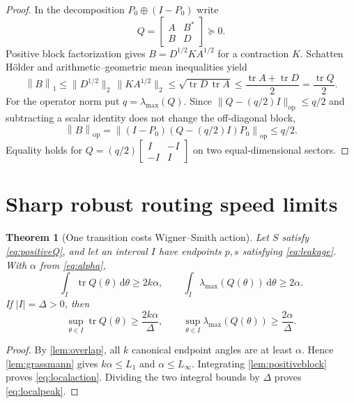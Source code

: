 \documentclass[11pt]{article}
\newtheorem{theorem}{Theorem}[section]
\theoremstyle{definition}
\theoremstyle{remark}
\newcommand{\tr}{\operatorname{tr}}
\newcommand{\dd}{\mathrm{d}}
\newcommand{\snorm}[1]{\left\lVert#1\right\rVert_1}
\newcommand{\onorm}[1]{\left\lVert#1\right\rVert_{\mathrm{op}}}
\begin{document}
\begin{proof}
In the decomposition $P_0\oplus(I-P_0)$ write
\[
 Q=\begin{bmatrix}A&B^*\\B&D\end{bmatrix}\succeq0.
\]
Positive block factorization gives
$B=D^{1/2}KA^{1/2}$ for a contraction $K$.  Schatten H\"older and
arithmetic--geometric mean inequalities yield
\[
 \snorm{B}
 \leq\|D^{1/2}\|_2\,\|KA^{1/2}\|_2
 \leq\sqrt{\tr D\,\tr A}
 \leq\frac{\tr A+\tr D}{2}=\frac{\tr Q}{2}.
\]
For the operator norm put $q=\lambda_{\max}(Q)$.  Since
$\|Q-(q/2)I\|_{\mathrm{op}}\leq q/2$ and subtracting a scalar identity does
not change the off-diagonal block,
\[
 \onorm{B}
 =\onorm{(I-P_0)(Q-(q/2)I)P_0}\leq q/2.
\]
Equality holds for
$Q=(q/2)\left[\begin{smallmatrix}I&-I\\-I&I\end{smallmatrix}\right]$
on two equal-dimensional sectors.
\end{proof}

\section{Sharp robust routing speed limits}

\begin{theorem}[One transition costs Wigner--Smith action]
\label{thm:local}
Let $S$ satisfy \eqref{eq:positiveQ}, and let an interval $I$ have endpoints
$p,s$ satisfying \eqref{eq:leakage}.  With $\alpha$ from
\eqref{eq:alpha},
\begin{equation}\label{eq:localaction}
 \boxed{
 \int_I\tr Q(\theta)\,\dd\theta\geq2k\alpha,
 \qquad
 \int_I\lambda_{\max}(Q(\theta))\,\dd\theta\geq2\alpha.}
\end{equation}
If $|I|=\Delta>0$, then
\begin{equation}\label{eq:localpeak}
 \boxed{
 \sup_{\theta\in I}\tr Q(\theta)\geq\frac{2k\alpha}{\Delta},
 \qquad
 \sup_{\theta\in I}\lambda_{\max}(Q(\theta))
 \geq\frac{2\alpha}{\Delta}.}
\end{equation}
\end{theorem}

\begin{proof}
By \cref{lem:overlap}, all $k$ canonical endpoint angles are at least
$\alpha$.  Hence \cref{lem:grassmann} gives
$k\alpha\leq L_1$ and $\alpha\leq L_\infty$.  Integrating
\cref{lem:positiveblock} proves \eqref{eq:localaction}.  Dividing the two
integral bounds by $\Delta$ proves \eqref{eq:localpeak}.
\end{proof}
\end{document}
